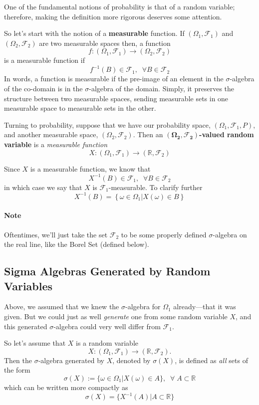 \documentclass[12pt]{article}
\theoremstyle{plain}
\theoremstyle{definition}
\theoremstyle{remark}
\begin{document}
One of the fundamental notions of probability is that of a random
variable; therefore, making the definition more rigorous
deserves some attention.

So let's start with the notion of a \textbf{measurable} function.
If $(\Omega_1, \mathcal{F}_1)$ and $(\Omega_2, \mathcal{F}_2)$ are two
measurable spaces then, a function
   \[ f: (\Omega_1, \mathcal{F}_1) \rightarrow (\Omega_2, \mathcal{F}_2)
      \]
is a measurable function if
   \[ f^{-1}(B) \in \mathcal{F}_1, \;\; \forall B \in\mathcal{F}_2 \]
In words, a function is measurable if the pre-image of an element in
the $\sigma$-algebra of the co-domain is in the
$\sigma$-algebra of the domain.  Simply, it preserves the structure
between two measurable spaces, sending measurable sets
in one measurable space to measurable sets in the other.

Turning to probability, suppose  that we have our probability space,
$(\Omega_1, \mathcal{F}_1, P)$, and another measurable space,
$(\Omega_2,\mathcal{F}_2)$.  Then an
$\mathbf{(\Omega_2, \mathcal{F}_2)}$\textbf{-valued random variable}
is a \emph{measurable function}
\[ X: (\Omega_1, \mathcal{F}_1) \rightarrow (\mathbb{R},
   \mathcal{F}_2) \]

Since $X$ is a measurable function, we know that
   \[ X^{-1}(B) \in \mathcal{F}_1, \;\; \forall B \in \mathcal{F}_2\]
in which case we say that $X$ is $\mathcal{F}_1$-measurable.
To clarify further
   \[ X^{-1}(B) = \left\{ \omega \in \Omega_1 | X(\omega)
      \in B \right\} \]

\paragraph{Note} Oftentimes, we'll just take the set
$\mathcal{F}_2$ to be some properly
defined $\sigma$-algebra on the real line, like the Borel Set
(defined below).

\subsection{Sigma Algebras Generated by Random Variables}

Above, we assumed that we knew the $\sigma$-algebra for
$\Omega_1$ already---that it was given. But we
could just as well \emph{generate} one from some random variable $X$,
and this generated $\sigma$-algebra could very well differ from
$\mathcal{F}_1$.

So let's assume that $X$ is a random variable
   \[X: (\Omega_1,\mathcal{F}_1) \rightarrow
      (\mathbb{R},\mathcal{F}_2).\]
Then the $\sigma$-algebra generated by $X$, denoted by $\sigma(X)$, is
defined as \emph{all} sets of the form
   \[ \sigma(X) := \{ \omega \in \Omega_1 | X(\omega) \in A \}, \;\;
      \forall \; A \subset \mathbb{R} \]
which can be written more compactly as
   \[\sigma(X)  = \{ X^{-1}(A) | A\subset \mathbb{R}  \} \]
\end{document}
